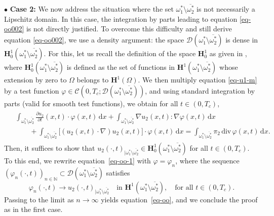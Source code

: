 \documentclass[a4paper,12pt,reqno,natbib]{amsart}
\newcommand{\dx} {\displaystyle\mathrm{d}x}
\begin{document}
\noindent$\bullet$ \textbf{Case 2:} We now address the situation where the set \( \omega_1^* \setminus \overline{\omega_2^*} \) is not necessarily a Lipschitz domain. In this case, the integration by parts leading to equation \eqref{eq-oo002} is not directly justified. To overcome this difficulty and still derive equation \eqref{eq-oo002}, we use a density argument: the space \( \mathcal{D}(\omega_1^* \setminus \overline{\omega_2^*}) \) is dense in \( \mathbf{H}_0^1(\omega_1^* \setminus \overline{\omega_2^*}) \). For this, let us recall the definition of the space \( \mathbf{H}_0^1 \) as given in \cite[Definition 3.3.43]{HenrotBook2006}, where \( \mathbf{H}_0^1(\omega_1^* \setminus \overline{\omega_2^*}) \) is defined as the set of functions in \( \mathbf{H}^1(\omega_1^* \setminus \overline{\omega_2^*}) \) whose extension by zero to \( \Omega \) belongs to \( \mathbf{H}^1(\Omega) \). We then multiply equation \eqref{eq-u1-m} by a test function \( \varphi \in \mathcal{C}(0,T_c;\mathcal{D}(\omega_1^* \setminus \overline{\omega_2^*})) \), and using standard integration by parts (valid for smooth test functions), we obtain for all \( t \in (0, T_c) \),
\begin{align}
    \begin{split}
    \label{eq-oo-1}
&\int_{\omega_1^* \setminus \overline{\omega_2^*}} \frac{\partial u_2}{\partial t}(x,t) \cdot \varphi(x,t) \, \dx + \int_{\omega_1^* \setminus \overline{\omega_2^*}} \nabla u_2(x,t) : \nabla \varphi(x,t) \, \dx\\
&\qquad+\int_{\omega_1^* \setminus \overline{\omega_2^*}} \big[(u_2(x,t)\cdot\nabla)u_2(x,t)\big] \cdot \varphi(x,t) \, \dx=\int_{\omega_1^* \setminus \overline{\omega_2^*}} \pi_2\,\text{div}\,\varphi(x,t) \, \dx.
\end{split}
 \end{align}
Then, it suffices to show that ${u_2}(\cdot,t)_{| \omega_1^* \setminus \overline{\omega_2^*}} \in \mathbf{H}_0^1\left(\omega_1^* \setminus \overline{\omega_2^*}\right)$ for all $t \in (0, T_c)$. To this end, we rewrite equation~\eqref{eq-oo-1} with $\varphi = \varphi_n$, where the sequence $\left(\varphi_n(\cdot, t)\right)_{n \in \mathbb{N}} \subset \mathcal{D}\left(\omega_1^* \setminus \overline{\omega_2^*}\right)$ satisfies
\[
\varphi_n (\cdot,t)\to {u_2(\cdot,t)}_{| \omega_1^* \setminus \overline{\omega_2^*}} \quad \text{in } \mathbf{H}^1\left(\omega_1^* \setminus \overline{\omega_2^*}\right), \quad \text{for all } t \in (0, T_c).
\]
Passing to the limit as $n \to \infty$ yields equation~\eqref{eq-oo}, and we conclude the proof as in the first case.\\
\end{document}
